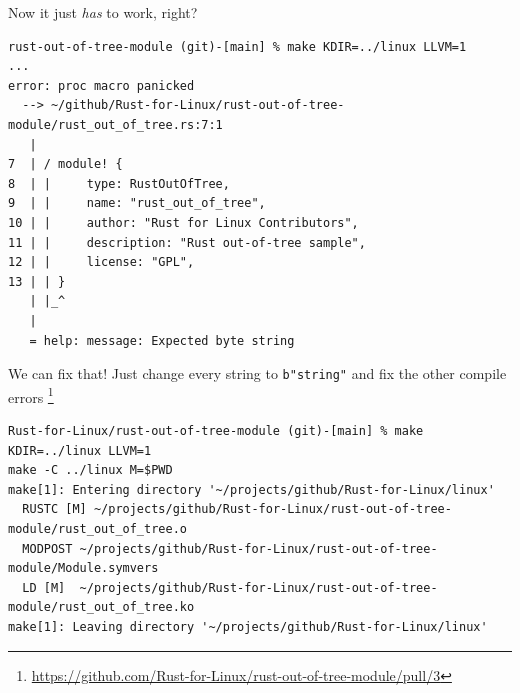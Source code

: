 \begin{frame}[c,fragile]{Now it just \emph{has} to work, right?}
\pause
\begin{verbatim}
rust-out-of-tree-module (git)-[main] % make KDIR=../linux LLVM=1
...
error: proc macro panicked
  --> ~/github/Rust-for-Linux/rust-out-of-tree-module/rust_out_of_tree.rs:7:1
   |
7  | / module! {
8  | |     type: RustOutOfTree,
9  | |     name: "rust_out_of_tree",
10 | |     author: "Rust for Linux Contributors",
11 | |     description: "Rust out-of-tree sample",
12 | |     license: "GPL",
13 | | }
   | |_^
   |
   = help: message: Expected byte string
\end{verbatim}
\end{frame}

\begin{frame}[c,fragile]{We can fix that!}
Just change every string to \texttt{b"string"} and fix the other compile errors
\footnote{\url{https://github.com/Rust-for-Linux/rust-out-of-tree-module/pull/3}}
\pause
\begin{verbatim}
Rust-for-Linux/rust-out-of-tree-module (git)-[main] % make KDIR=../linux LLVM=1
make -C ../linux M=$PWD
make[1]: Entering directory '~/projects/github/Rust-for-Linux/linux'
  RUSTC [M] ~/projects/github/Rust-for-Linux/rust-out-of-tree-module/rust_out_of_tree.o
  MODPOST ~/projects/github/Rust-for-Linux/rust-out-of-tree-module/Module.symvers
  LD [M]  ~/projects/github/Rust-for-Linux/rust-out-of-tree-module/rust_out_of_tree.ko
make[1]: Leaving directory '~/projects/github/Rust-for-Linux/linux'
\end{verbatim}
\end{frame}


